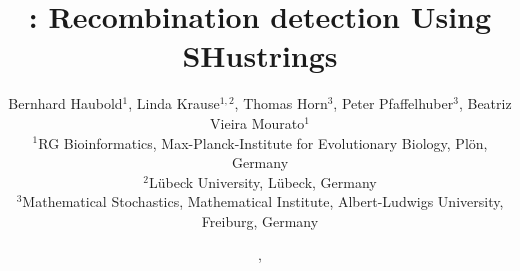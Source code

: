 \documentclass{article}
\begin{document}
\pagestyle{noweb}

\title{: Recombination detection Using SHustrings}
\author{Bernhard Haubold$^1$, Linda Krause$^{1,2}$, Thomas Horn$^3$, Peter
  Pfaffelhuber$^3$, Beatriz Vieira Mourato$^1$\\
\small $^1$RG Bioinformatics, Max-Planck-Institute for Evolutionary Biology, Pl\"on,
Germany\\
\small $^2$L\"ubeck University, L\"ubeck, Germany\\
\small $^3$Mathematical Stochastics, Mathematical Institute,
Albert-Ludwigs University, Freiburg, Germany}
\date{\!\!, }
\maketitle




\end{document}
